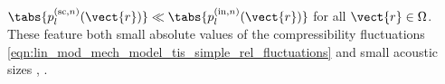 $\tabs{ p_{l}^{(\text{sc}, n)}( \vect{r} ) } \ll \tabs{ p_{l}^{(\text{in}, n)}( \vect{r} ) }$ for
all $\vect{r} \in \Omega$.
These feature both
small absolute values of
the compressibility fluctuations
\eqref{eqn:lin_mod_mech_model_tis_simple_rel_fluctuations} and
small acoustic sizes
\cite{article:LiPIER2010},
\cite[708]{book:Born1999}.

